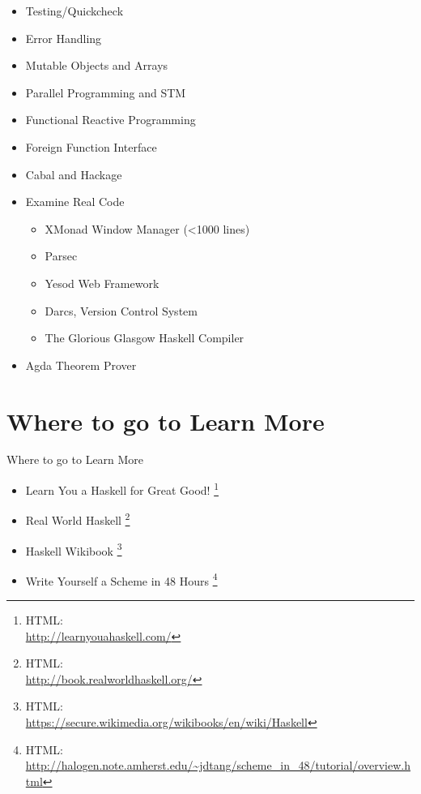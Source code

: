 \documentclass{beamer}                  %
\newcommand{\srule}{
	\rule{\textwidth}{1pt}\\
}
\newlength{\subsecwidth}
\newenvironment{slide}{
	\begin{frame} %
	\settowidth{\subsecwidth}{\insertsubsection} %
	\ifthenelse{\dimtest{\subsecwidth}{<}{1pt}}{ %
		\frametitle{\insertsection\\             %
		\vspace{-1ex}                            %
		\color{fore}\srule                       %
		\par                                     %
		\vspace{-3ex}                            %
		}
	}{                                           %
		\frametitle{\insertsection\ -- \insertsubsection\\ %
		\vspace{-1ex}                            %
		\color{fore}\srule                       %
		\par                                     %
		\vspace{-3ex}                            %
		}
	}
	\Large                                       %
}{
	\end{frame}
}
\newcommand{\titleslide}[1]{
	\section{#1}             %
	\begin{slide}
		\begin{center}
			\color{comments}
			\Huge            %
			#1               %
		\end{center}
	\end{slide}
}
\renewcommand{\thefootnote}{\fnsymbol{footnote}} %
\begin{document}
\begin{slide}
  \begin{itemize}
    \item Testing/Quickcheck
    \item Error Handling
    \item Mutable Objects and Arrays
    \item Parallel Programming and STM
    \item Functional Reactive Programming
    \item Foreign Function Interface
    \item Cabal and Hackage
    \item Examine Real Code
      \begin{itemize}
        \item XMonad Window Manager (<1000 lines)
        \item Parsec
        \item Yesod Web Framework
        \item Darcs, Version Control System
        \item The Glorious Glasgow Haskell Compiler
      \end{itemize}
    \item Agda Theorem Prover
  \end{itemize}
\end{slide}





\renewcommand{\thefootnote}{\arabic{footnote}} %
\setcounter{footnote}{0}                       %
\titleslide{Where to go to Learn More}
\begin{slide}
  \begin{itemize}
    \normalsize

  \item Learn You a Haskell for Great Good!
    \footnote{
      HTML:\\ \url{http://learnyouahaskell.com/}
    }

  \item Real World Haskell
    \footnote{
      HTML:\\ \url{http://book.realworldhaskell.org/}
    }

  \item Haskell Wikibook
    \footnote{
      HTML:\\ \url{https://secure.wikimedia.org/wikibooks/en/wiki/Haskell}
    }

  \item Write Yourself a Scheme in 48 Hours
    \footnote{
      HTML:\\ \url{http://halogen.note.amherst.edu/~jdtang/scheme_in_48/tutorial/overview.html}
    }

  \end{itemize}
\end{slide}
\end{document}
